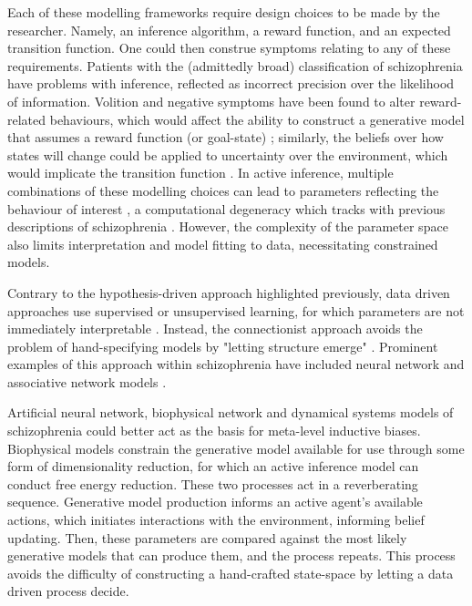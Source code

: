 \documentclass{article}
\begin{document}
Each of these modelling frameworks require design choices to be made by the researcher. Namely, an inference algorithm, a reward function, and an expected transition function. One could then construe symptoms relating to any of these requirements. Patients with the (admittedly broad) classification of schizophrenia have problems with inference, reflected as incorrect precision over the likelihood of information. Volition and negative symptoms have been found to alter reward-related behaviours, which would affect the ability to construct a generative model that assumes a reward function (or goal-state) \citep{culbreth2023transdiagnostic}; similarly, the beliefs over how states will change could be applied to uncertainty over the environment, which would implicate the transition function \citep{kaplan2016estimating}. In active inference, multiple combinations of these modelling choices can lead to parameters reflecting the behaviour of interest \citep{sajid2020degeneracy}, a computational degeneracy which tracks with previous descriptions of schizophrenia \citep{friston2016dysconnection}. However, the complexity of the parameter space also limits interpretation and model fitting to data, necessitating constrained models.

Contrary to the hypothesis-driven approach highlighted previously, data driven approaches use supervised or unsupervised learning, for which parameters are not immediately interpretable \citep{doerig2023neuroconnectionist}. Instead, the connectionist approach  avoids the problem of hand-specifying models by "letting structure emerge" \citep{mclelland2010letting}. Prominent examples of this approach within schizophrenia have included neural network and associative network models \citep{hoffman2001neural, stein2021biologically}.

Artificial neural network, biophysical network and dynamical systems models of schizophrenia could better act as the basis for meta-level inductive biases. Biophysical models constrain the generative model available for use through some form of dimensionality reduction, for which an active inference model can conduct free energy reduction. These two processes act in a reverberating sequence. Generative model production informs an active agent’s available actions, which initiates interactions with the environment, informing belief updating. Then, these parameters are compared against the most likely generative models that can produce them, and the process repeats. This process avoids the difficulty of constructing a hand-crafted state-space by letting a data driven process decide. %
\end{document}
